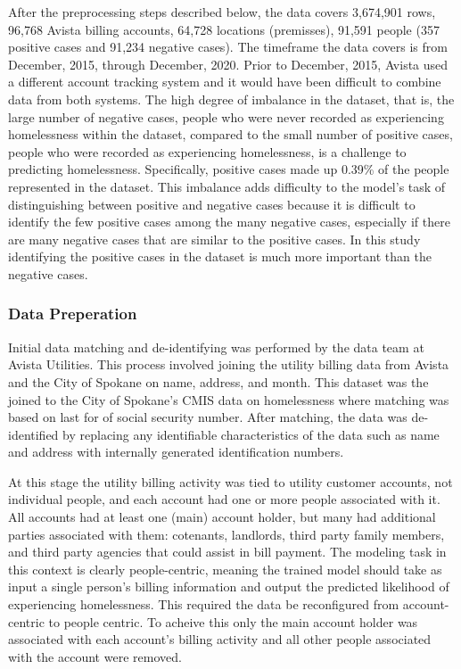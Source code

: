 \documentclass[10pt,letterpaper]{article}
\newcommand{\red}[1]{{\color{red}{#1}}}
\begin{document}
After the preprocessing steps described below, the data covers 3,674,901 rows, 96,768 Avista billing accounts, 64,728 locations (premisses), 91,591 people (357 positive cases and 91,234 negative cases). The timeframe the data covers is from December, 2015, through December, 2020. Prior to December, 2015, Avista used a different account tracking system and it would have been difficult to combine data from both systems. \red{ADD proportion of Spokane population}
The high degree of imbalance in the dataset, that is, the large number of negative cases, people who were never recorded as experiencing homelessness within the dataset, compared to the small number of positive cases, people who were recorded as experiencing homelessness, is a challenge to predicting homelessness. Specifically, positive cases made up 0.39\% of the people represented in the dataset. This imbalance adds difficulty to the model's task of distinguishing between positive and negative cases because it is difficult to identify the few positive cases among the many negative cases, especially if there are many negative cases that are similar to the positive cases. In this study identifying the positive cases in the dataset is much more important than the negative cases.

\subsubsection*{Data Preperation}
Initial data matching and de-identifying was performed by the data team at Avista Utilities. This process involved joining the utility billing data from Avista and the City of Spokane on name, address, and month. This dataset was the joined to the City of Spokane's CMIS data on homelessness where matching was based on last for of social security number. After matching, the data was de-identified by replacing any identifiable characteristics of the data such as name and address with internally generated identification numbers. 

At this stage the utility billing activity was tied to utility customer accounts, not individual people, and each account had one or more people associated with it. All accounts had at least one (main) account holder, but many had additional parties associated with them: cotenants, landlords, third party family members, and third party agencies that could assist in bill payment. The modeling task in this context is clearly people-centric, meaning the trained model should take as input a single person's billing information and output the predicted likelihood of experiencing homelessness. This required the data be reconfigured from account-centric to people centric. To acheive this only the main account holder was associated with each account's billing activity and all other people associated with the account were removed.
\end{document}
